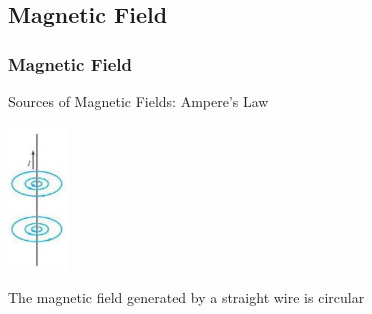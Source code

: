 \documentclass[]{beamer}
\begin{document}







\subsection{Magnetic Field}

\begin{frame}
\frametitle{Magnetic Field}



Sources of Magnetic Fields: Ampere's Law

\begin{center}
  \includegraphics[height=1.5in]{images5/B.jpg}
\end{center}

\pause

The magnetic field generated by a straight wire is circular


  \end{frame}










\end{document}
